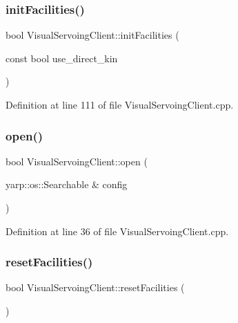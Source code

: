 \subsubsection{\texorpdfstring{init\+Facilities()}{initFacilities()}}
{\footnotesize\ttfamily bool Visual\+Servoing\+Client\+::init\+Facilities (\begin{DoxyParamCaption}\item[{const bool}]{use\+\_\+direct\+\_\+kin }\end{DoxyParamCaption})\hspace{0.3cm}{\ttfamily [override]}}



Definition at line 111 of file Visual\+Servoing\+Client.\+cpp.

\mbox{\label{classVisualServoingClient_ad898a60edcd6dae0b2083db81bf08962}} 
\subsubsection{\texorpdfstring{open()}{open()}}
{\footnotesize\ttfamily bool Visual\+Servoing\+Client\+::open (\begin{DoxyParamCaption}\item[{yarp\+::os\+::\+Searchable \&}]{config }\end{DoxyParamCaption})\hspace{0.3cm}{\ttfamily [override]}}



Definition at line 36 of file Visual\+Servoing\+Client.\+cpp.

\mbox{\label{classVisualServoingClient_a9e0fe7d6cb6cee09c0fb9ed3903a66be}} 
\subsubsection{\texorpdfstring{reset\+Facilities()}{resetFacilities()}}
{\footnotesize\ttfamily bool Visual\+Servoing\+Client\+::reset\+Facilities (\begin{DoxyParamCaption}{ }\end{DoxyParamCaption})\hspace{0.3cm}{\ttfamily [override]}}




